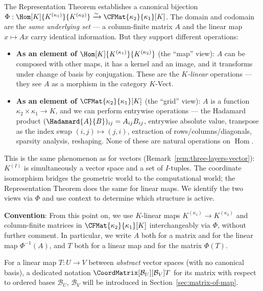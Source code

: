\begin{remark}
\label{rem:grid-vs-map}
    The Representation Theorem establishes a canonical bijection
    $\Phi: \Hom[K]{K^{(\kappa_1)}}{K^{(\kappa_2)}} \xrightarrow{\sim}
    \CFMat{\kappa_2}{\kappa_1}[K]$. The domain and codomain are the \emph{same underlying
    set} --- a column-finite matrix $A$ and the linear map $x \mapsto Ax$ carry identical
    information. But they support different operations:
    \begin{itemize}
        \item \textbf{As an element of
              $\Hom[K]{K^{(\kappa_1)}}{K^{(\kappa_2)}}$} (the ``map'' view): $A$ can be
              composed with other maps, it has a kernel and an image, and it transforms under
              change of basis by conjugation. These are the \emph{$K$-linear} operations ---
              they see $A$ as a morphism in the category $K$-Vect.
        \item \textbf{As an element of
              $\CFMat{\kappa_2}{\kappa_1}[K]$} (the ``grid'' view): $A$ is a function
              $\kappa_2 \times \kappa_1 \to K$, and we can perform entrywise operations ---
              the Hadamard product $(\Hadamard{A}{B})_{ij} = A_{ij} B_{ij}$, entrywise
              absolute value, transpose as the index swap $(i,j) \mapsto (j,i)$, extraction of
              rows/columns/diagonals, sparsity analysis, reshaping. None of these are natural
              operations on $\operatorname{Hom}$.
    \end{itemize}
    This is the same phenomenon as for vectors
    (Remark~\ref{rem:three-layers-vector}): $K^{(I)}$ is simultaneously a vector space and a
    set of $I$-tuples. The coordinate isomorphism bridges the geometric world to the
    computational world; the Representation Theorem does the same for linear maps. We identify
    the two views via $\Phi$ and use context to determine which structure is active.

    \textbf{Convention}: From this point on, we use $K$-linear maps
    $K^{(\kappa_1)} \to K^{(\kappa_2)}$ and column-finite matrices in
    $\CFMat{\kappa_2}{\kappa_1}[K]$ interchangeably via $\Phi$, without further comment.
    In particular, we write $A$ both for a matrix and for the linear map $\Phi^{-1}(A)$,
    and $T$ both for a linear map and for the matrix $\Phi(T)$.

    For a linear map $T: U \to V$ between \emph{abstract} vector spaces (with no canonical
    basis), a dedicated notation $\CoordMatrix[\mathcal{B}_U][\mathcal{B}_V]{T}$ for its
    matrix with respect to ordered bases $\mathcal{B}_U$, $\mathcal{B}_V$ will be
    introduced in Section~\ref{sec:matrix-of-map}.


\end{remark}
